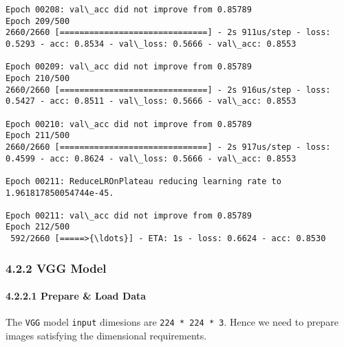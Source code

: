 \documentclass[11pt]{article}
\begin{document}
\begin{Verbatim}[commandchars=\\\{\}]
Epoch 00208: val\_acc did not improve from 0.85789
Epoch 209/500
2660/2660 [==============================] - 2s 911us/step - loss: 0.5293 - acc: 0.8534 - val\_loss: 0.5666 - val\_acc: 0.8553

Epoch 00209: val\_acc did not improve from 0.85789
Epoch 210/500
2660/2660 [==============================] - 2s 916us/step - loss: 0.5427 - acc: 0.8511 - val\_loss: 0.5666 - val\_acc: 0.8553

Epoch 00210: val\_acc did not improve from 0.85789
Epoch 211/500
2660/2660 [==============================] - 2s 917us/step - loss: 0.4599 - acc: 0.8624 - val\_loss: 0.5666 - val\_acc: 0.8553

Epoch 00211: ReduceLROnPlateau reducing learning rate to 1.961817850054744e-45.

Epoch 00211: val\_acc did not improve from 0.85789
Epoch 212/500
 592/2660 [=====>{\ldots}] - ETA: 1s - loss: 0.6624 - acc: 0.8530
    \end{Verbatim}

    \hypertarget{vgg-model}{%
\subsubsection{4.2.2 VGG Model}\label{vgg-model}}

    \hypertarget{prepare-load-data}{%
\paragraph{4.2.2.1 Prepare \& Load Data}\label{prepare-load-data}}

    The \texttt{VGG} model \texttt{input} dimesions are
\texttt{224\ *\ 224\ *\ 3}. Hence we need to prepare images satisfying
the dimensional requirements.
\end{document}
